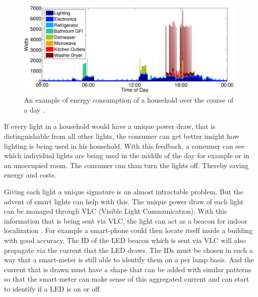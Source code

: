 \begin{figure}[t]
	\centering
	\includegraphics[width=\textwidth]{chapters/introduction-chapters/energy-consumption-house.png}
	\caption{An example of energy consumption of a household over the course of a day \cite{kolter2011redd}.}
	\label{fig:energy-consumption-house}
\end{figure}




If every light in a household would have a unique power draw, that is distinguishable from all other lights, the consumer can get better insight how lighting is being used in his household. 
With this feedback, a consumer can see which individual lights are being used in the middle of the day for example or in an unoccupied room.
The consumer can than turn the lights off.
Thereby saving energy and costs.



Giving each light a unique signature is an almost intractable problem.
But the advent of smart lights can help with this.
The unique power draw of each light can be managed through VLC (Visible Light Communication).
With this information that is being sent via VLC, the light can act as a beacon for indoor localization \cite{Kuo:2014:LIP:2639108.2639109}.
For example a smart-phone could then locate itself inside a building with good accuracy.
The ID of the LED beacon which is sent via VLC will also propagate via the current that the LED draws.
The IDs must be chosen in such a way that a smart-meter is still able to identify them on a per lamp basis.
And the current that is drawn must have a shape that can be added with similar patterns so that the smart-meter can make sense of this aggregated current and can start to identify if a LED is on or off.




















